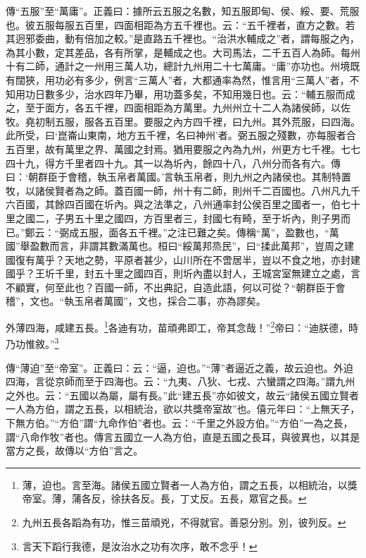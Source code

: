 {\noindent\zhuan{}\fzbyks 傳“五服”至“萬庸”。正義曰：據所云五服之名數，知五服即甸、侯、綏、要、荒服也。彼五服每服五百里，四面相距為方五千裡也。云：“五千裡者，直方之數。若其迥邪委曲，動有倍加之較。”是直路五千裡也。“治洪水輔成之”者，謂每服之內，為其小數，定其差品，各有所掌，是輔成之也。大司馬法，二千五百人為師。每州十有二師，通計之一州用三萬人功，總計九州用二十七萬庸。“庸”亦功也。州境既有闊狹，用功必有多少，例言“三萬人”者，大都通率為然，惟言用“三萬人”者，不知用功日數多少，治水四年乃畢，用功蓋多矣，不知用幾日也。云：“輔五服而成之，至于面方，各五千裡，四面相距為方萬里。九州州立十二人為諸侯師，以佐牧。堯初制五服，服各五百里。要服之內方四千裡，曰九州。其外荒服，曰四海。此所受，曰‘崑崙山東南，地方五千裡，名曰神州’者。弼五服之殘數，亦每服者合五百里，故有萬里之界、萬國之封焉。猶用要服之內為九州，州更方七千裡。七七四十九，得方千里者四十九。其一以為圻內，餘四十八，八州分而各有六。傳曰：‘朝群臣于會稽，執玉帛者萬國。’言執玉帛者，則九州之內諸侯也。其制特置牧，以諸侯賢者為之師。蓋百國一師，州十有二師，則州千二百國也。八州凡九千六百國，其餘四百國在圻內。與之法準之，八州通率封公侯百里之國者一，伯七十里之國二，子男五十里之國四，方百里者三，封國七有畸，至于圻內，則子男而已。”鄭云：“弼成五服，面各五千裡。”之注已難之矣。傳稱“萬”，盈數也，“萬國”舉盈數而言，非謂其數滿萬也。桓曰“綏萬邦烝民”，曰“揉此萬邦”，豈周之建國復有萬乎？天地之勢，平原者甚少，山川所在不啻居半，豈以不食之地，亦封建國乎？王圻千里，封五十里之國四百，則圻內盡以封人，王城宮室無建立之處，言不顧實，何至此也？百國一師，不出典記，自造此語，何以可從？“朝群臣于會稽”，文也。“執玉帛者萬國”，文也，採合二事，亦為謬矣。 \par}

外薄四海，咸建五長。\footnote{薄，迫也。言至海。諸侯五國立賢者一人為方伯，謂之五長，以相統治，以獎帝室。薄，蒲各反，徐扶各反。長，丁丈反。五長，眾官之長。}各迪有功，苗頑弗即工，帝其念哉！”\footnote{九州五長各蹈為有功，惟三苗頑兇，不得就官。善惡分別。別，彼列反。}帝曰：“迪朕德，時乃功惟敘。”\footnote{言天下蹈行我德，是汝治水之功有次序，敢不念乎！}

{\noindent\zhuan{}\fzbyks 傳“薄迫”至“帝室”。正義曰：云：“逼，迫也。”“薄”者逼近之義，故云迫也。外迫四海，言從京師而至于四海也。云：“九夷、八狄、七戎、六蠻謂之四海。”謂九州之外也。云：“五國以為屬，屬有長。”此“建五長”亦如彼文，故云“諸侯五國立賢者一人為方伯，謂之五長，以相統治，欲以共獎帝室故”也。僖元年曰：“上無天子，下無方伯。”“方伯”謂“九命作伯”者也。云：“千里之外設方伯。”“方伯”一為之長，謂“八命作牧”者也。傳言五國立一人為方伯，直是五國之長耳，與彼異也，以其是當方之長，故傳以“方伯”言之。 \par}

